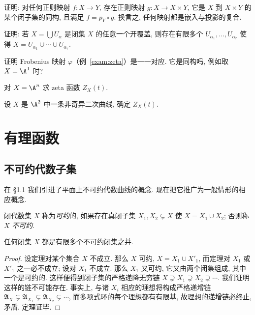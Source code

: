 \begin{compactenum}
	\item 证明: 对任何正则映射 $f: X \to Y$, 存在正则映射 $g: X \to X \times Y$, 它是 $X$ 到 $X \times Y$ 的某个闭子集的同构, 且满足 $f = p_Y \circ g$. 换言之, 任何映射都是嵌入与投影的复合.
	\item 证明: 若 $X = \bigcup U_\alpha$ 是闭集 $X$ 的任意一个开覆盖, 则存在有限多个 $U_{\alpha_1}, \ldots, U_{\alpha_r}$ 使得 $X = U_{\alpha_1} \cup \cdots \cup U_{\alpha_r}$.
	\item 证明 Frobenius 映射 $\varphi$（例~\ref{exam:zeta}）是一一对应. 它是同构吗, 例如取 $X = \A^1$ 时?
	\item 对 $X = \A^n$ 求 zeta 函数 $Z_X(t)$.
	\item 设 $X$ 是 $\A^2$ 中一条非奇异二次曲线, 确定 $Z_X(t)$.
\end{compactenum}

\section{有理函数}

\subsection{不可约代数子集}

在 §1.1 我们引进了平面上不可约代数曲线的概念. 现在把它推广为一般情形的相应概念.

\begin{definition}[不可约闭集]\label{def:irreducible-set}
	闭代数集 $X$ 称为\emph{可约}的, 如果存在真闭子集 $X_1, X_2 \subsetneq X$ 使 $X = X_1 \cup X_2$; 否则称 $X$ \emph{不可约}.
\end{definition}

\begin{theorem}\label{thm:finite-union-irreducible}
	任何闭集 $X$ 都是有限多个不可约闭集之并.
\end{theorem}

\begin{proof}
	设定理对某个集合 $X$ 不成立. 那么 $X$ 可约, $X = X_1 \cup X'_1$, 而定理对 $X_1$ 或 $X'_1$ 之一必不成立; 设对 $X_1$ 不成立. 那么 $X_1$ 又可约, 它又由两个闭集组成, 其中一个是可约的. 这样便得到闭子集的严格递降无穷链 $X \supsetneq X_1 \supsetneq X_2 \supsetneq \cdots$. 我们证明这样的链不可能存在. 事实上, 与诸 $X_i$ 相应的理想将构成严格递增链 $\mathfrak A_X \subsetneq \mathfrak A_{X_1} \subsetneq \mathfrak A_{X_2} \subsetneq \cdots$, 而多项式环的每个理想都有有限基, 故理想的递增链必终止, 矛盾. 定理证毕.
\end{proof}

